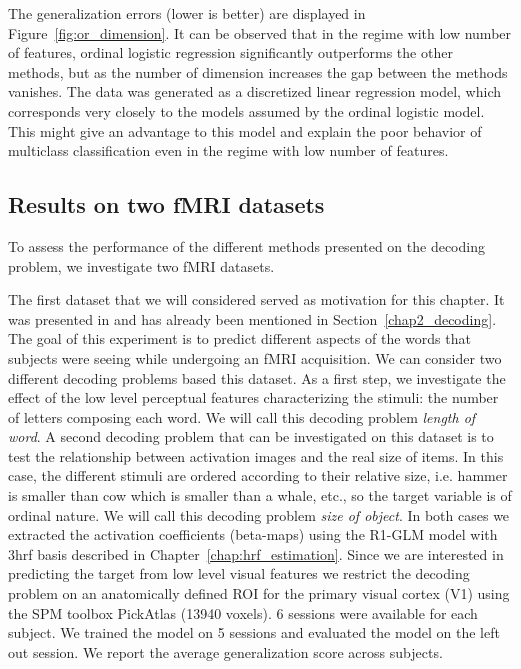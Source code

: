 The generalization errors (lower is better) are displayed in Figure~\ref{fig:or_dimension}. It can be observed that in the regime with low number of features, ordinal logistic regression significantly outperforms the other methods, but as the number of dimension increases the gap between the methods vanishes. The data was generated as a discretized linear regression model, which corresponds very closely to the models assumed by the ordinal logistic model. This might give an advantage to this model and explain the poor behavior of multiclass classification even in the regime with low number of features.




\subsection{Results on two fMRI datasets}


To assess the performance of the different methods presented on the decoding problem, we investigate two fMRI datasets. 

The first dataset that we will considered served as motivation for this chapter. It was presented in \citep{Borghesani2014} and has already been mentioned in Section~\ref{chap2_decoding}. The goal of this experiment is to predict different aspects of the words that subjects were seeing while undergoing an fMRI acquisition. We can consider two different decoding problems based this dataset. As a first step, we investigate the effect of the low level perceptual features characterizing the stimuli: the number of letters composing each word. We will call this decoding problem \emph{length of word}. A second decoding problem that can be investigated on this dataset is to test the relationship between
activation images and the real size of items. In this case, the different stimuli are ordered according to their relative size, i.e. hammer is smaller than cow which is smaller than a whale, etc., so the target variable is of ordinal nature. We will call this decoding problem \emph{size of object}. In both cases we extracted the activation coefficients (beta-maps) using the R1-GLM model with 3hrf basis described in Chapter~\ref{chap:hrf_estimation}. Since we are interested in predicting the target from low level visual features we restrict the decoding problem on an anatomically defined ROI for the primary visual cortex (V1) using the SPM toolbox PickAtlas (13940 voxels). 6 sessions were available for each subject. We trained the model on 5 sessions and evaluated the model on the left out session. We report the average generalization score across subjects.



